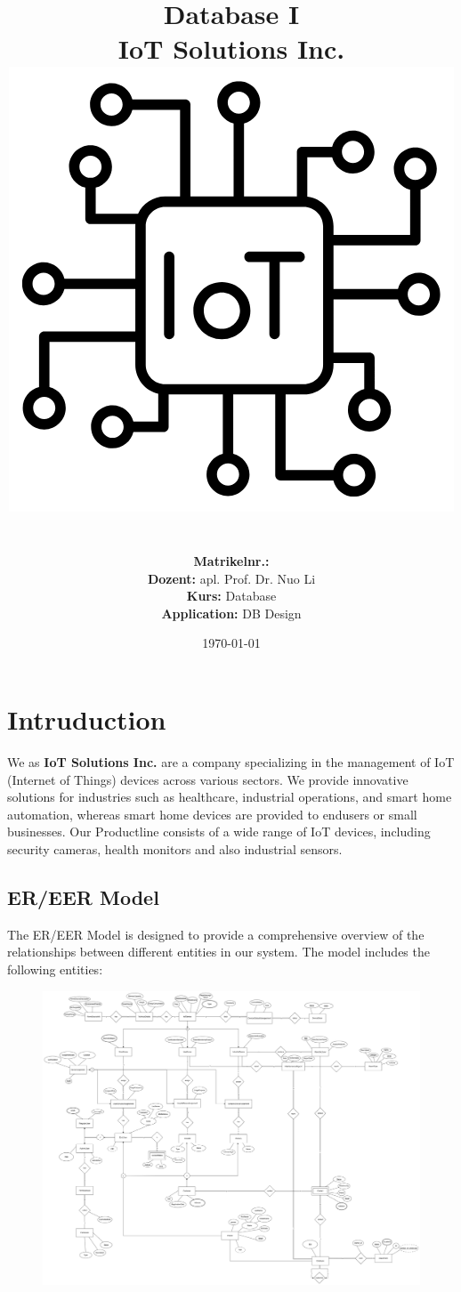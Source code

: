 \documentclass{article}
\title{
    \textbf{Database I} \\
    \textbf{IoT Solutions Inc. } \\
    \vspace{2em}
    \includegraphics[width=0.5\linewidth]{img/title.png} 
}
\author{
    \vspace{8em} \\
    \textbf{Matrikelnr.:} \\
    \textbf{Dozent:} apl. Prof. Dr. Nuo Li \\
    \textbf{Kurs:} Database\\
    \textbf{Application:}  DB Design \\
    \vspace{8em} 
}
\date{\today}
\begin{document}
\maketitle

% 



\newpage
\section{Intruduction}

We as \textbf{IoT Solutions Inc. } are a company specializing in the management of IoT (Internet of Things) devices across various sectors. We provide innovative solutions for industries such as healthcare, industrial operations, and smart home automation, whereas smart home devices are provided to endusers or small businesses. 
Our Productline consists of a wide range of IoT devices, including security cameras, health monitors and also industrial sensors. 

\subsection{ER/EER Model}
The ER/EER Model is designed to provide a comprehensive overview of the relationships between different entities in our system. The model includes the following entities: 

\begin{figure}[H]
\centering
\includegraphics[width=\linewidth]{img/EER.png}
\end{figure}
\end{document}
